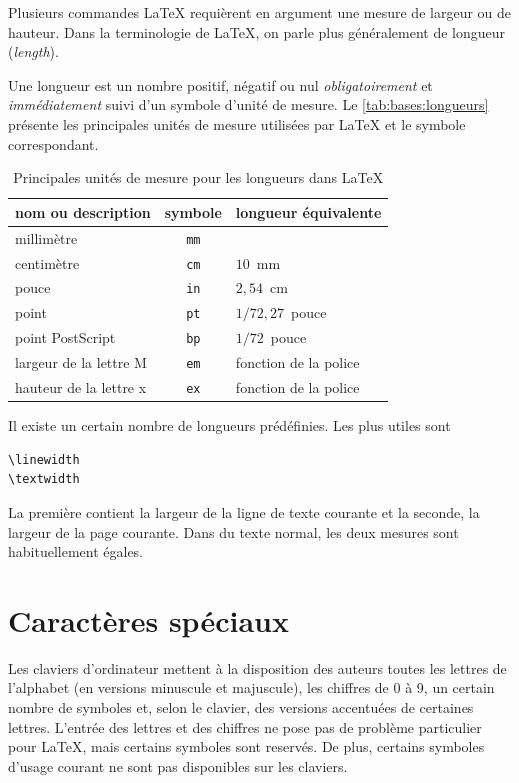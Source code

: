 Plusieurs commandes {\LaTeX} requièrent en argument une mesure de
largeur ou de hauteur. Dans la terminologie de {\LaTeX}, on parle plus
généralement de longueur (\emph{length}).

Une longueur est un nombre positif, négatif ou nul
\emph{obligatoirement} et \emph{immédiatement} suivi d'un symbole
d'unité de mesure. Le \autoref{tab:bases:longueurs} présente les
principales unités de mesure utilisées par {\LaTeX} et le symbole
correspondant.

\begin{table}
  \caption{Principales unités de mesure pour les longueurs dans
    {\LaTeX}}
  \label{tab:bases:longueurs}
  \centering
  \begin{tabular}{lcl}
    \toprule
    nom ou description & symbole & longueur équivalente \\
    \midrule
    millimètre & \texttt{mm} \\
    centimètre & \texttt{cm} & $10$~mm \\
    pouce      & \texttt{in} & $2,54$~cm \\
    point      & \texttt{pt} & $1/72,27$~pouce \\
    point PostScript     & \texttt{bp}   & $1/72$~pouce \\
    largeur de la lettre M & \texttt{em} & fonction de la police \\
    hauteur de la lettre x & \texttt{ex} & fonction de la police \\
    \bottomrule
  \end{tabular}
\end{table}

Il existe un certain nombre de longueurs prédéfinies. Les plus utiles sont
\begin{lstlisting}
\linewidth
\textwidth
\end{lstlisting}
La première contient la largeur de la ligne de texte courante et la
seconde, la largeur de la page courante. Dans du texte normal, les
deux mesures sont habituellement égales.


\section{Caractères spéciaux}
\label{chap:bases:caracteres}

Les claviers d'ordinateur mettent à la disposition des auteurs toutes
les lettres de l'alphabet (en versions minuscule et majuscule), les
chiffres de 0 à 9, un certain nombre de symboles et, selon le clavier,
des versions accentuées de certaines lettres. L'entrée des lettres et
des chiffres ne pose pas de problème particulier pour {\LaTeX}, mais
certains symboles sont reservés. De plus, certains symboles d'usage
courant ne sont pas disponibles sur les claviers.

